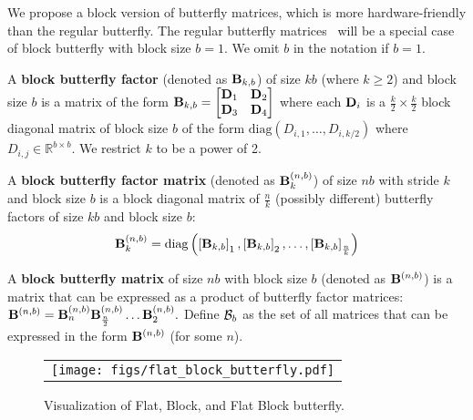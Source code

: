 We propose a block version of butterfly matrices, which is more
hardware-friendly than the regular butterfly.
The regular butterfly matrices~\citet{dao2019learning, dao2020kaleidoscope} will be a special case of block butterfly with
block size $b = 1$.
We omit $b$ in the notation if $b = 1$.
\begin{definition} \label{def:bfactor}
  A \textbf{block butterfly factor} (denoted as $\mathbf{B}_{k, b}$) of size $kb$ (where $k \ge 2$) and block size $b$ is a matrix of the form
    \(
        \mathbf{B}_{k, b} = \begin{bmatrix}
            \mathbf{D}_1 & \mathbf{D}_2 \\ \mathbf{D}_3 & \mathbf{D}_4
        \end{bmatrix}
    \)
    where each $\mathbf{D}_i$ is a $\frac{k}{2} \times \frac{k}{2}$ block diagonal
    matrix of block size $b$ of the form
    $\mathrm{diag} \left( D_{i, 1}, \dots, D_{i, k/2} \right)$ where
    $D_{i, j} \in \mathbb{R}^{b \times b}$.
    We restrict $k$ to be a power of 2.
\end{definition}
\begin{definition}
  A \textbf{block butterfly factor matrix} (denoted as $\mathbf{B}_{k}^{(n, b)}$) of size $nb$ with stride $k$ and
     block size $b$ is a block diagonal matrix
     of $\frac{n}{k}$ (possibly different) butterfly factors of size $kb$ and
     block size $b$:
     \[
        \mathbf{B}_{k}^{(n, b)} = \mathrm{diag} \left( \left[ \mathbf{B}_{k, b} \right]_1, \left[ \mathbf{B}_{k, b} \right]_2, \hdots, \left[ \mathbf{B}_{k, b} \right]_\frac{n}{k} \right)
     \]
\end{definition}

\begin{definition} \label{def:bmatrix}
    A \textbf{block butterfly matrix} of size $nb$ with block size $b$ (denoted as $\mathbf{B}^{(n, b)}$) is a matrix that can be expressed as a product of butterfly factor matrices:
    \(
        \mathbf{B}^{(n, b)} = \mathbf{B}_n^{(n, b)} \mathbf{B}_{\frac{n}{2}}^{(n, b)} \hdots \mathbf{B}_2^{(n, b)}.
    \)
    Define $\mathcal{B}_b$ as the set of all matrices that can be expressed in the form $\mathbf{B}^{(n, b)}$ (for some $n$).
\end{definition}

\begin{figure}
\vspace{-1.2cm}
	\begin{center}
		\begin{tabular}{c}
			\texttt{[image: figs/flat\_block\_butterfly.pdf]}
		\end{tabular}
	\end{center}
	\captionsetup{font=small}
		\vspace{-0.8cm}
	\caption{Visualization of Flat, Block, and Flat Block butterfly.}
	\label{fig:tradeoff}
	\vspace{-0.3cm}
\end{figure}

